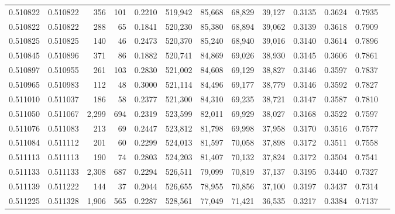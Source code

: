 \begin{tabular}{rrrrrrrrrrrrr}
0.510822 & 0.510822 &   356 &   101 &                                     0.2210 & 519,942 &  85,668 &  68,829 &  39,127 & 0.3135 & 0.3624 & 0.7935 \\
0.510822 & 0.510822 &   288 &    65 &                                     0.1841 & 520,230 &  85,380 &  68,894 &  39,062 & 0.3139 & 0.3618 & 0.7909 \\
0.510825 & 0.510825 &   140 &    46 &                                     0.2473 & 520,370 &  85,240 &  68,940 &  39,016 & 0.3140 & 0.3614 & 0.7896 \\
0.510845 & 0.510896 &   371 &    86 &                                     0.1882 & 520,741 &  84,869 &  69,026 &  38,930 & 0.3145 & 0.3606 & 0.7861 \\
0.510897 & 0.510955 &   261 &   103 &                                     0.2830 & 521,002 &  84,608 &  69,129 &  38,827 & 0.3146 & 0.3597 & 0.7837 \\
0.510965 & 0.510983 &   112 &    48 &                                     0.3000 & 521,114 &  84,496 &  69,177 &  38,779 & 0.3146 & 0.3592 & 0.7827 \\
0.511010 & 0.511037 &   186 &    58 &                                     0.2377 & 521,300 &  84,310 &  69,235 &  38,721 & 0.3147 & 0.3587 & 0.7810 \\
0.511050 & 0.511067 & 2,299 &   694 &                                     0.2319 & 523,599 &  82,011 &  69,929 &  38,027 & 0.3168 & 0.3522 & 0.7597 \\
0.511076 & 0.511083 &   213 &    69 &                                     0.2447 & 523,812 &  81,798 &  69,998 &  37,958 & 0.3170 & 0.3516 & 0.7577 \\
0.511084 & 0.511112 &   201 &    60 &                                     0.2299 & 524,013 &  81,597 &  70,058 &  37,898 & 0.3172 & 0.3511 & 0.7558 \\
0.511113 & 0.511113 &   190 &    74 &                                     0.2803 & 524,203 &  81,407 &  70,132 &  37,824 & 0.3172 & 0.3504 & 0.7541 \\
0.511133 & 0.511133 & 2,308 &   687 &                                     0.2294 & 526,511 &  79,099 &  70,819 &  37,137 & 0.3195 & 0.3440 & 0.7327 \\
0.511139 & 0.511222 &   144 &    37 &                                     0.2044 & 526,655 &  78,955 &  70,856 &  37,100 & 0.3197 & 0.3437 & 0.7314 \\
0.511225 & 0.511328 & 1,906 &   565 &                                     0.2287 & 528,561 &  77,049 &  71,421 &  36,535 & 0.3217 & 0.3384 & 0.7137 \\

\end{tabular}
